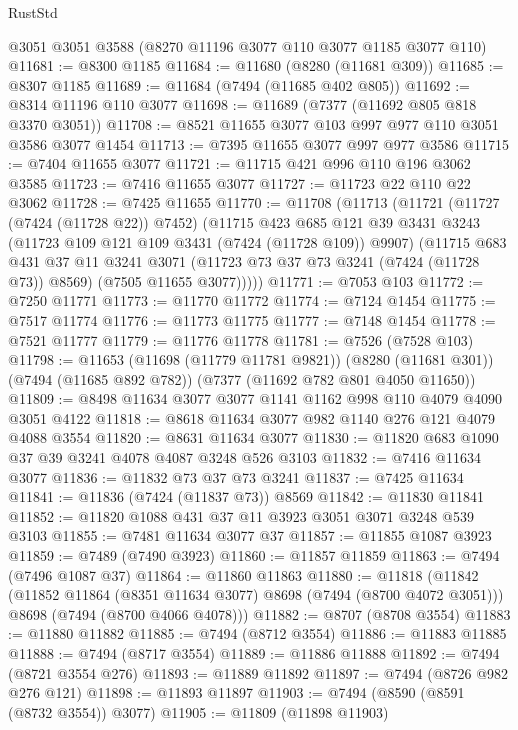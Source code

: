 \begin{lexlean}{RustStd}
\begin{coremodule}
{\begin{coremodule}
{{{{{{{{{{{{{{{{{{{{{{{{{{{{{{{{    @3051
    @3051
    @3588
    (@8270 @11196 @3077 @110 @3077 @1185 @3077 @110)
@11681 := @8300 @1185
@11684 := @11680 (@8280 (@11681 @309))
@11685 := @8307 @1185
@11689 := @11684 (@7494 (@11685 @402 @805))
@11692 := @8314 @11196 @110 @3077
@11698 := @11689 (@7377 (@11692 @805 @818 @3370 @3051))
@11708 := @8521 @11655 @3077 @103 @997 @977 @110 @3051 @3586 @3077 @1454
@11713 := @7395 @11655 @3077 @997 @977 @3586
@11715 := @7404 @11655 @3077
@11721 := @11715 @421 @996 @110 @196 @3062 @3585
@11723 := @7416 @11655 @3077
@11727 := @11723 @22 @110 @22 @3062
@11728 := @7425 @11655
@11770 := @11708
    (@11713
      (@11721
        (@11727 (@7424 (@11728 @22)) @7452)
        (@11715
          @423
          @685
          @121
          @39
          @3431
          @3243
          (@11723 @109 @121 @109 @3431 (@7424 (@11728 @109)) @9907)
          (@11715
            @683
            @431
            @37
            @11
            @3241
            @3071
            (@11723 @73 @37 @73 @3241 (@7424 (@11728 @73)) @8569)
            (@7505 @11655 @3077)))))
@11771 := @7053 @103
@11772 := @7250 @11771
@11773 := @11770 @11772
@11774 := @7124 @1454
@11775 := @7517 @11774
@11776 := @11773 @11775
@11777 := @7148 @1454
@11778 := @7521 @11777
@11779 := @11776 @11778
@11781 := @7526 (@7528 @103)
@11798 := @11653
    (@11698 (@11779 @11781 @9821))
    (@8280 (@11681 @301))
    (@7494 (@11685 @892 @782))
    (@7377 (@11692 @782 @801 @4050 @11650))
@11809 := @8498 @11634 @3077 @3077 @1141 @1162 @998 @110 @4079 @4090 @3051 @4122
@11818 := @8618 @11634 @3077 @982 @1140 @276 @121 @4079 @4088 @3554
@11820 := @8631 @11634 @3077
@11830 := @11820 @683 @1090 @37 @39 @3241 @4078 @4087 @3248 @526 @3103
@11832 := @7416 @11634 @3077
@11836 := @11832 @73 @37 @73 @3241
@11837 := @7425 @11634
@11841 := @11836 (@7424 (@11837 @73)) @8569
@11842 := @11830 @11841
@11852 := @11820 @1088 @431 @37 @11 @3923 @3051 @3071 @3248 @539 @3103
@11855 := @7481 @11634 @3077 @37
@11857 := @11855 @1087 @3923
@11859 := @7489 (@7490 @3923)
@11860 := @11857 @11859
@11863 := @7494 (@7496 @1087 @37)
@11864 := @11860 @11863
@11880 := @11818
    (@11842
      (@11852 @11864 (@8351 @11634 @3077) @8698 (@7494 (@8700 @4072 @3051)))
      @8698
      (@7494 (@8700 @4066 @4078)))
@11882 := @8707 (@8708 @3554)
@11883 := @11880 @11882
@11885 := @7494 (@8712 @3554)
@11886 := @11883 @11885
@11888 := @7494 (@8717 @3554)
@11889 := @11886 @11888
@11892 := @7494 (@8721 @3554 @276)
@11893 := @11889 @11892
@11897 := @7494 (@8726 @982 @276 @121)
@11898 := @11893 @11897
@11903 := @7494 (@8590 (@8591 (@8732 @3554)) @3077)
@11905 := @11809 (@11898 @11903)
}}}}}}}}}}}}}}}}}}}}}}}}}}}}}}}}
\end{coremodule}}
\end{coremodule}
\end{lexlean}
